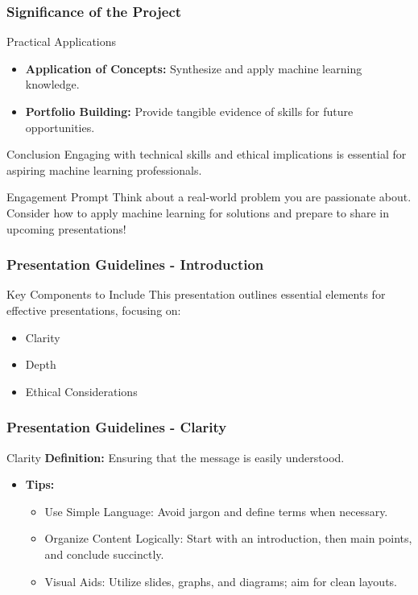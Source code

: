 \documentclass[aspectratio=169]{beamer}
\begin{document}
\begin{frame}[fragile]
    \frametitle{Significance of the Project}
    \begin{block}{Practical Applications}
        \begin{itemize}
            \item \textbf{Application of Concepts:} Synthesize and apply machine learning knowledge.
            \item \textbf{Portfolio Building:} Provide tangible evidence of skills for future opportunities.
        \end{itemize}
    \end{block}

    \begin{block}{Conclusion}
        Engaging with technical skills and ethical implications is essential for aspiring machine learning professionals.
    \end{block}

    \begin{block}{Engagement Prompt}
        Think about a real-world problem you are passionate about. Consider how to apply machine learning for solutions and prepare to share in upcoming presentations!
    \end{block}
\end{frame}

\begin{frame}[fragile]
    \frametitle{Presentation Guidelines - Introduction}
    \begin{block}{Key Components to Include}
        This presentation outlines essential elements for effective presentations, focusing on:
        \begin{itemize}
            \item Clarity
            \item Depth
            \item Ethical Considerations
        \end{itemize}
    \end{block}
\end{frame}

\begin{frame}[fragile]
    \frametitle{Presentation Guidelines - Clarity}
    \begin{block}{Clarity}
        \textbf{Definition:} Ensuring that the message is easily understood.
    \end{block}
    \begin{itemize}
        \item \textbf{Tips:}
        \begin{itemize}
            \item Use Simple Language: Avoid jargon and define terms when necessary.
            \item Organize Content Logically: Start with an introduction, then main points, and conclude succinctly.
            \item Visual Aids: Utilize slides, graphs, and diagrams; aim for clean layouts.
        \end{itemize}
    \end{itemize}
\end{frame}
\end{document}

